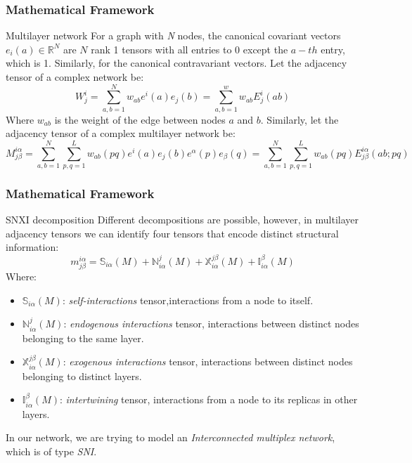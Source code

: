 \documentclass[10pt]{beamer}
\begin{document}
\begin{frame}
\frametitle{Mathematical Framework}
    \begin{definition}{Multilayer network}
        For a graph with \textit{N} nodes, the canonical covariant vectors $e_i(a)\in\mathbb{R}^{N}$ are $N$ rank 1 tensors with all entries to 0 except the $a-th$ entry, which is 1. 
        Similarly, for the canonical contravariant vectors.
        Let the adjacency tensor of a complex network be:
        \begin{equation}
            W_j^i=\sum_{a,b=1}^{N}w_{ab}e^i(a)e_j(b)=\sum_{a,b=1}^{w}w_{ab}E_j^i(ab)
        \end{equation}
        Where $w_{ab}$ is the weight of the edge between nodes $a$ and $b$.
        Similarly, let the adjacency tensor of a complex multilayer network be: 
        \begin{equation}
            M_{j\beta}^{i\alpha}=\sum_{a,b=1}^{N}\sum_{p,q=1}^{L}w_{ab}(pq)e^i(a)e_j(b)e^\alpha(p)e_\beta(q)
                                =\sum_{a,b=1}^{N}\sum_{p,q=1}^{L}w_{ab}(pq)E_{j\beta}^{i\alpha}(ab;pq)      
        \end{equation}
    \end{definition}
\end{frame}
\begin{frame}
    \frametitle{Mathematical Framework}
    \begin{definition}{SNXI decomposition}
        Different decompositions are possible, however, in multilayer adjacency tensors we can identify four tensors that encode distinct structural information:
        \begin{equation}
            m_{j\beta}^{i\alpha} = \mathbb{S}_{i\alpha}(M) + \mathbb{N}_{i\alpha}^j(M) + \mathbb{X}_{i\alpha}^{j\beta}(M)+\mathbb{I}_{i\alpha}^{\beta}(M)
        \end{equation}
        Where:
        \footnotesize
        \begin{itemize}
            \item $\mathbb{S}_{i\alpha}(M)$: \textit{self-interactions} tensor,interactions from a node to itself.
            \item $\mathbb{N}_{i\alpha}^j(M)$: \textit{endogenous interactions} tensor, interactions between distinct nodes belonging to the same layer.
            \item $\mathbb{X}_{i\alpha}^{j\beta}(M)$: \textit{exogenous interactions} tensor, interactions between distinct nodes belonging to distinct layers.
            \item $\mathbb{I}_{i\alpha}^{\beta}(M)$: \textit{intertwining} tensor, interactions from a node to its replicas in other layers.
        \end{itemize}
        \normalsize
        In our network, we are trying to model an \textit{Interconnected multiplex network}, which is of type \textit{SNI}.
    \end{definition}
\end{frame}
\end{document}
